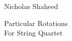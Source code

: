 \newcommand*{\titleTH}{\begingroup %
\raggedleft %
\vspace*{\baselineskip} %

{\fontsize{20}{115}\selectfont Nicholas Shaheed}\\[0.167\textheight] %


\vfill %

{\fontsize{65}{115}\selectfont Particular Rotations}\\[\baselineskip] %

{\fontsize{25}{115}\selectfont For String Quartet}\par %

\vfill %

{\fontsize{20}{115}\selectfont \yr}\par %

\vspace*{3\baselineskip} %
\endgroup}




\pagestyle{empty} %


\titleTH %

\afterpage{\null\newpage}


